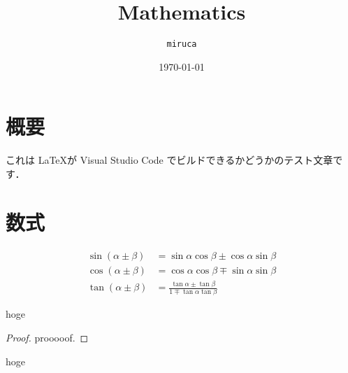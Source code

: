 \documentclass[dvipdfmx,uplatex]{jsarticle}
\begin{document}
\title{Mathematics}
\author{\texttt{miruca}}
\date{\today}
\maketitle

\section{概要}
これは \LaTeX が Visual Studio Code でビルドできるかどうかのテスト文章です．

\section{数式}
\begin{align}
    \sin(\alpha \pm \beta) &= \sin \alpha \cos \beta \pm \cos \alpha \sin \beta \\
    \cos(\alpha \pm \beta) &= \cos \alpha \cos \beta \mp \sin \alpha \sin \beta \\
    \tan(\alpha \pm \beta) &= \frac{\tan \alpha \pm \tan \beta}{1 \mp \tan \alpha \tan \beta}
\end{align}

\begin{defbox}
    \begin{definition}
      hoge
    \end{definition}
\end{defbox}

\begin{proof}
    prooooof.  
\end{proof}
%
\vspace{\baselineskip}
\begin{theorembox}
    \begin{theorem}
      hoge
    \end{theorem}
\end{theorembox}
\end{document}
